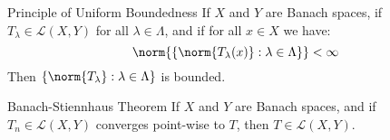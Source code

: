 \documentclass[crop=false,class=book,oneside]{standalone}
\begin{document}
        \begin{ltheorem}{Principle of Uniform Boundedness}
            If $X$ and $Y$ are Banach spaces, if
            $T_{\lambda}\in\mathcal{L}(X,Y)$ for all
            $\lambda\in\Lambda$, and if for all $x\in{X}$ we have:
            \begin{equation}
                \norm{\{\norm{T_{\lambda}(x)}:\lambda\in\Lambda\}}
                <\infty
            \end{equation}
            Then $\{\norm{T_{\lambda}}:\lambda\in\Lambda\}$ is
            bounded.
        \end{ltheorem}
        \begin{ltheorem}{Banach-Stiennhaus Theorem}
            If $X$ and $Y$ are Banach spaces, and if
            $T_{n}\in\mathcal{L}(X,Y)$ converges point-wise to
            $T$, then $T\in\mathcal{L}(X,Y)$.
        \end{ltheorem}
\end{document}
